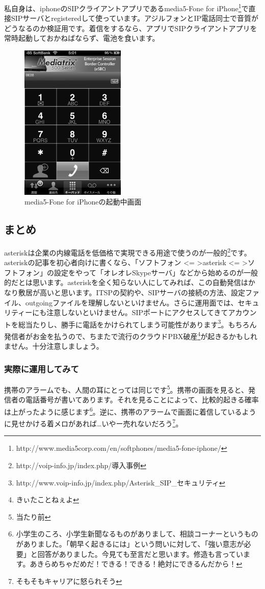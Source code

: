 私自身は、iphoneのSIPクライアントアプリであるmedia5-Fone for iPhone\footnote{http://www.media5corp.com/en/softphones/media5-fone-iphone/}で直接SIPサーバとregisteredして使っています。アジルフォンとIP電話同士で音質がどうなるのか検証用です。着信をするなら、アプリでSIPクライアントアプリを常時起動しておかねばならず、電池を食います。
\begin{figure}[htbp]
 \begin{center}
  \includegraphics[width=50mm]{tboffice-asterisk/img/media5.eps}
 \end{center}
 \caption{media5-Fone for iPhoneの起動中画面}
 \label{fig:media5}
\end{figure}

\subsection{まとめ}
asteriskは企業の内線電話を低価格で実現できる用途で使うのが一般的\footnote{http://voip-info.jp/index.php/導入事例}です。asteriskの記事を初心者向けに書くなら、「ソフトフォン \textless = \textgreater asterisk \textless = \textgreater ソフトフォン」の設定をやって「オレオレSkypeサーバ」などから始めるのが一般的だとは思います。asteriskを全く知らない人にしてみれば、この自動発信はかなり敷居が高いと思います。ITSPの契約や、SIPサーバの接続の方法、設定ファイル、outgoingファイルを理解しないといけません。さらに運用面では、セキュリティーにも注意しないといけません。SIPポートにアクセスしてきてアカウントを総当たりし、勝手に電話をかけられてしまう可能性があります\footnote{http://www.voip-info.jp/index.php/Asterisk\_SIP\_セキュリティ}。もちろん発信者がお金を払うので、ちまたで流行のクラウドPBX破産\footnote{きぃたことねぇよ}が起きるかもしれません。十分注意しましょう。

\subsubsection{実際に運用してみて}
携帯のアラームでも、人間の耳にとっては同じです\footnote{当たり前}。携帯の画面を見ると、発信者の電話番号が書いてあります。それを見ることによって、比較的起きる確率は上がったように感じます\footnote{小学生のころ、小学生新聞なるものがありまして、相談コーナーというものがありました。「朝早く起きるには」という問いに対して、「強い意志が必要」と回答がありました。今見ても至言だと思います。修造も言っています。あきらめちゃだめだ！できる！できる！絶対にできるんだから！}。逆に、携帯のアラームで画面に着信しているように見せかける着メロがあれば…いやー売れないだろう\footnote{そもそもキャリアに怒られそう}。


